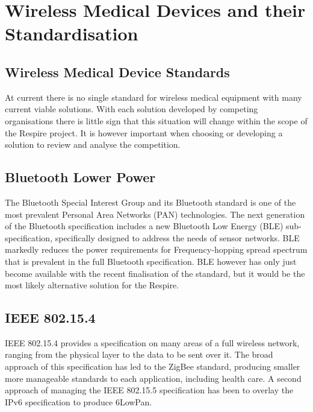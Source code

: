 
\section{Wireless Medical Devices and their Standardisation}

\subsection{Wireless Medical Device Standards}
At current there is no single standard for wireless medical equipment with many current viable
solutions. With each solution developed by competing organisations there is little sign that this
situation will change within the scope of the Respire project. It is however important when choosing
or developing a solution to review and analyse the competition.

\subsection{Bluetooth Lower Power}
The Bluetooth Special Interest Group and its Bluetooth standard is one of the most prevalent
Personal Area Networks (PAN) technologies. The next generation of the Bluetooth specification
includes a new Bluetooth Low Energy (BLE) sub-specification, specifically designed to address the
needs of sensor networks. BLE markedly reduces the power requirements for Frequency-hopping
spread spectrum that is prevalent in the full Bluetooth specification. BLE however has only just
become available with the recent finalisation of the standard, but it would be the most likely
alternative solution for the Respire.


\subsection{IEEE 802.15.4}
IEEE 802.15.4 provides a specification on many areas of a full wireless network, ranging from the
physical layer to the data to be sent over it. The broad approach of this specification has led to the
ZigBee standard, producing smaller more manageable standards to each application, including
health care. A second approach of managing the IEEE 802.15.5 specification has been to overlay the
IPv6 specification to produce 6LowPan.


